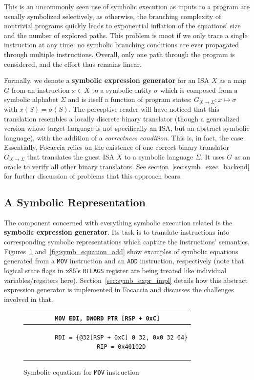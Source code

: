 This is an uncommonly seen use of symbolic execution as inputs to a program are usually symbolized selectively, as
otherwise, the branching complexity of nontrivial programs quickly leads to exponential inflation of the equations' size
and the number of explored paths. This problem is moot if we only trace a single instruction at any time: no symbolic
branching conditions are ever propagated through multiple instructions.  Overall, only one path through the program is
considered, and the effort thus remains linear.

Formally, we denote a \textbf{symbolic expression generator} for an \ac{ISA} $X$ as a map $G$ from an instruction $x \in
X$ to a symbolic entity $\sigma$ which is composed from a symbolic alphabet $\Sigma$ and is itself a function of program
states: $G_{X \rightarrow \Sigma}: x \mapsto \sigma$ with $x(S) = \sigma(S)$. The perceptive reader will have noticed
that this translation resembles a locally discrete binary translator (though a generalized version whose target language
is not specifically an \ac{ISA}, but an abstract symbolic language), with the addition of a \textit{correctness
condition}. This is, in fact, the case. Essentially, Focaccia relies on the existence of one correct binary translator
$G_{X \rightarrow \Sigma}$ that translates the guest \ac{ISA} $X$ to a symbolic language $\Sigma$. It uses $G$ as an
oracle to verify all other binary translators. See section~\ref{sec:symb_exec_backend} for further discussion of
problems that this approach bears.

\subsection{A Symbolic Representation}

The component concerned with everything symbolic execution related is the \textbf{symbolic expression generator}. Its
task is to translate instructions into corresponding symbolic representations which capture the instructions' semantics.
Figures~\ref{fig:symb_equation_mov} and~\ref{fig:symb_equation_add} show examples of symbolic equations generated from a
\texttt{MOV} instruction and an \texttt{ADD} instruction, respectively (note that logical state flags in x86's
\texttt{RFLAGS} register are being treated like individual variables/regsiters here). Section~\ref{sec:symb_expr_impl}
details how this abstract expression generator is implemented in Focaccia and discusses the challenges involved in that.

\begin{figure}[htbp]
    \centering
    \begin{tabular}{c}
    \texttt{MOV        EDI, DWORD PTR [RSP + 0xC]} \\
    \midrule
    \begin{lstlisting}
        RDI = {@32[RSP + 0xC] 0 32, 0x0 32 64}
        RIP = 0x40102D
    \end{lstlisting}
    \end{tabular}
    \caption{Symbolic equations for \texttt{MOV} instruction}\label{fig:symb_equation_mov}
\end{figure}

